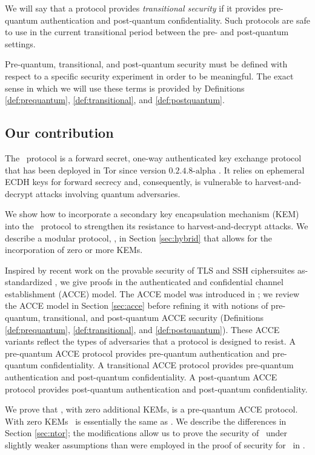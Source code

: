 \documentclass[USenglish,oneside,twocolumn]{article}
\theoremstyle{dgthm}
\theoremstyle{dgdef}
\newcommand{\ntor}{{\sf {ntor}}}
\newcommand{\hybrid}{{\sf {hybrid}}}
\begin{document}
  We will say that a protocol provides \emph{transitional security} if it
  provides pre-quantum authentication and post-quantum confidentiality. Such
  protocols are safe to use in the current transitional period between the
  pre- and post-quantum settings.

  Pre-quantum, transitional, and post-quantum security must be defined with
  respect to a specific security experiment in order to be meaningful. The
  exact sense in which we will use these terms is provided by Definitions
  \ref{def:prequantum}, \ref{def:transitional}, and \ref{def:postquantum}.

\subsection{Our contribution}
  The \ntor~protocol \cite{GoldbergSU13} is a forward secret, one-way
  authenticated key exchange protocol that has been deployed in Tor since
  version $0.2.4.8\text{-alpha}$ \cite{TorPropNtor}. It relies on ephemeral
  ECDH keys for forward secrecy and, consequently, is vulnerable to
  harvest-and-decrypt attacks involving quantum adversaries.

  We show how to incorporate a secondary key encapsulation mechanism (KEM) into
  the \ntor~protocol to strengthen its resistance to harvest-and-decrypt
  attacks. We describe a modular protocol, \hybrid, in Section \ref{sec:hybrid}
  that allows for the incorporation of zero or more KEMs.

  Inspired by recent work on the provable security of TLS and SSH ciphersuites
  as-standardized \cite{Jager2012,Krawczyk2013,Bergsma2014}, we give proofs in
  the authenticated and confidential channel establishment (ACCE) model. The
  ACCE model was introduced in \cite{Jager2012}; we review the ACCE model in
  Section \ref{sec:acce} before refining it with notions of pre-quantum,
  transitional, and post-quantum ACCE security (Definitions
  \ref{def:prequantum}, \ref{def:transitional}, and \ref{def:postquantum}).
  These ACCE variants reflect the types of adversaries that a protocol is
  designed to resist. A pre-quantum ACCE protocol provides pre-quantum
  authentication and pre-quantum confidentiality. A transitional ACCE protocol
  provides pre-quantum authentication and post-quantum confidentiality.  A
  post-quantum ACCE protocol provides post-quantum authentication and
  post-quantum confidentiality.

  We prove that \hybrid, with zero additional KEMs, is a pre-quantum ACCE
  protocol. With zero KEMs \hybrid~is essentially the same as \ntor. We
  describe the differences in Section \ref{sec:ntor}; the modifications allow
  us to prove the security of \hybrid~under slightly weaker assumptions than
  were employed in the proof of security for \ntor~in \cite{GoldbergSU13}.
\end{document}
